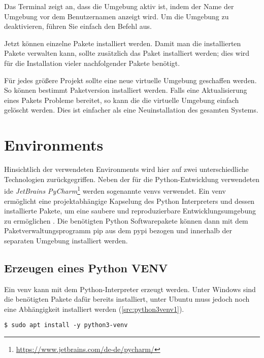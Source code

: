 \medskip

Das Terminal zeigt an, dass die Umgebung aktiv ist, indem der Name der Umgebung  vor dem Benutzernamen anzeigt wird. Um die Umgebung zu deaktivieren, führen Sie einfach den  Befehl  aus.

Jetzt können einzelne Pakete installiert werden. Damit man die installierten Pakete verwalten kann, sollte zusätzlich das Paket  installiert werden; dies wird für die Installation vieler nachfolgender Pakete benötigt.

\medskip


\medskip


Für jedes größere Projekt sollte eine neue virtuelle Umgebung geschaffen werden. So können bestimmt Paketversion installiert werden. Falls eine Aktualisierung eines Pakets Probleme bereitet, so kann die die virtuelle Umgebung einfach gelöscht werden. Dies ist einfacher als eine Neuinstallation des gesamten Systems.


\section{Environments}
\label{sec:environments}
Hinsichtlich der verwendeten Environments wird hier auf zwei unterschiedliche Technologien zurückgegriffen. Neben der für die Python-Entwicklung verwendeten \ac{ide} \emph{JetBrains PyCharm}\footnote{\url{https://www.jetbrains.com/de-de/pycharm/}} werden sogenannte \acp{venv} verwendet. Ein \ac{venv} ermöglicht eine projektabhängige Kapselung des Python Interpreters und dessen installierte Pakete, um eine saubere und reproduzierbare Entwicklungsumgebung zu ermöglichen \cite{Jaworski:2019}. Die benötigten Python Softwarepakete können dann mit dem Paketverwaltungsprogramm \ac{pip} aus dem \ac{pypi} bezogen und innerhalb der separaten Umgebung installiert werden.

\subsection{Erzeugen eines Python VENV}

Ein \ac{venv} kann mit dem Python-Interpreter erzeugt werden. Unter Windows sind die benötigten Pakete dafür bereits installiert, unter Ubuntu muss jedoch noch eine Abhängigkeit installiert werden (\cref{src:python3venv1}).

\begin{lstlisting}[language=MyBash, caption={Installation von VENV in Ubuntu}, label={src:python3venv1}]
	$ sudo apt install -y python3-venv
\end{lstlisting}

